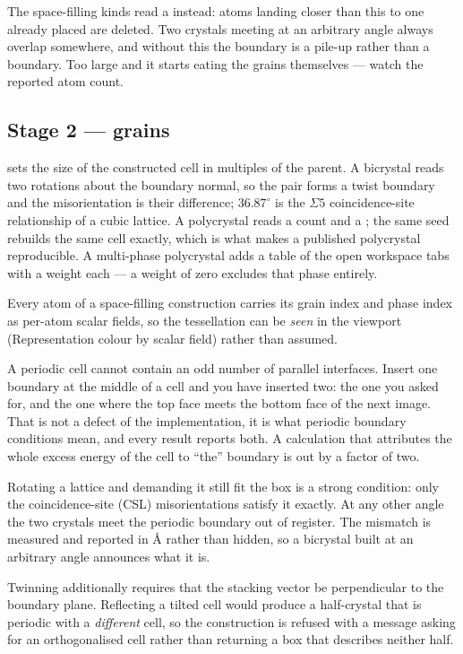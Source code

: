 The space-filling kinds read a  instead: atoms landing
closer than this to one already placed are deleted. Two crystals meeting
at an arbitrary angle always overlap somewhere, and without this the
boundary is a pile-up rather than a boundary. Too large and it starts
eating the grains themselves --- watch the reported atom count.

\subsection{Stage 2 --- grains}

 sets the size of the constructed cell in multiples of the
parent. A bicrystal reads two rotations about the boundary normal, so the
pair forms a twist boundary and the misorientation is their difference;
$36.87^{\circ}$ is the $\Sigma5$ coincidence-site relationship of a cubic
lattice. A polycrystal reads a  count and a ;
the same seed rebuilds the same cell exactly, which is what makes a
published polycrystal reproducible. A multi-phase polycrystal adds a table
of the open workspace tabs with a weight each --- a weight of zero
excludes that phase entirely.

Every atom of a space-filling construction carries its grain index and
phase index as per-atom scalar fields, so the tessellation can be
\emph{seen} in the viewport (Representation \menusep{} colour by scalar
field) rather than assumed.

\begin{calwarn}
A periodic cell cannot contain an odd number of parallel interfaces.
Insert one boundary at the middle of a cell and you have inserted two: the
one you asked for, and the one where the top face meets the bottom face of
the next image. That is not a defect of the implementation, it is what
periodic boundary conditions mean, and every result reports both. A
calculation that attributes the whole excess energy of the cell to ``the''
boundary is out by a factor of two.
\end{calwarn}

\begin{calnote}
Rotating a lattice and demanding it still fit the box is a strong
condition: only the coincidence-site (CSL) misorientations satisfy it
exactly. At any other angle the two crystals meet the periodic boundary
out of register. The mismatch is measured and reported in \AA{} rather
than hidden, so a bicrystal built at an arbitrary angle announces what it
is.

Twinning additionally requires that the stacking vector be perpendicular
to the boundary plane. Reflecting a tilted cell would produce a
half-crystal that is periodic with a \emph{different} cell, so the
construction is refused with a message asking for an orthogonalised cell
rather than returning a box that describes neither half.
\end{calnote}


